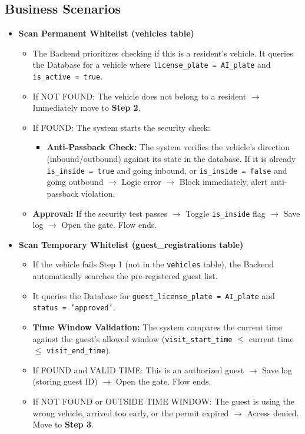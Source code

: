 \documentclass[a4paper]{article}
\begin{document}
\subsection{Business Scenarios}
\begin{tcolorbox}[colback=white!95!gray, colframe=black, title=Scenario 1: Happy Path (Fully Automated Flow \& Anti-spoofing)]
\begin{itemize}
    \item[\textbf{Step 1:}] \textbf{Scan Permanent Whitelist (vehicles table)}
    \begin{itemize}
        \item The Backend prioritizes checking if this is a resident's vehicle. It queries the Database for a vehicle where \texttt{license\_plate = AI\_plate} and \texttt{is\_active = true}.
        \item If NOT FOUND: The vehicle does not belong to a resident $\rightarrow$ Immediately move to \textbf{Step 2}.
        \item If FOUND: The system starts the security check:
        \begin{itemize}
            \item \textbf{Anti-Passback Check:} The system verifies the vehicle's direction (inbound/outbound) against its state in the database. If it is already \texttt{is\_inside = true} and going inbound, or \texttt{is\_inside = false} and going outbound $\rightarrow$ Logic error $\rightarrow$ Block immediately, alert anti-passback violation.
        \end{itemize}
        \item \textbf{Approval:} If the security test passes $\rightarrow$ Toggle \texttt{is\_inside} flag $\rightarrow$ Save log $\rightarrow$ Open the gate. Flow ends.
    \end{itemize}

    \item[\textbf{Step 2:}] \textbf{Scan Temporary Whitelist (guest\_registrations table)}
    \begin{itemize}
        \item If the vehicle fails Step 1 (not in the \texttt{vehicles} table), the Backend automatically searches the pre-registered guest list.
        \item It queries the Database for \texttt{guest\_license\_plate = AI\_plate} and \texttt{status = 'approved'}.
        \item \textbf{Time Window Validation:} The system compares the current time against the guest's allowed window (\texttt{visit\_start\_time} $\le$ current time $\le$ \texttt{visit\_end\_time}).
        \item If FOUND and VALID TIME: This is an authorized guest $\rightarrow$ Save log (storing guest ID) $\rightarrow$ Open the gate. Flow ends.
        \item If NOT FOUND or OUTSIDE TIME WINDOW: The guest is using the wrong vehicle, arrived too early, or the permit expired $\rightarrow$ Access denied. Move to \textbf{Step 3}.
    \end{itemize}


\end{itemize}
\end{tcolorbox}
\end{document}
